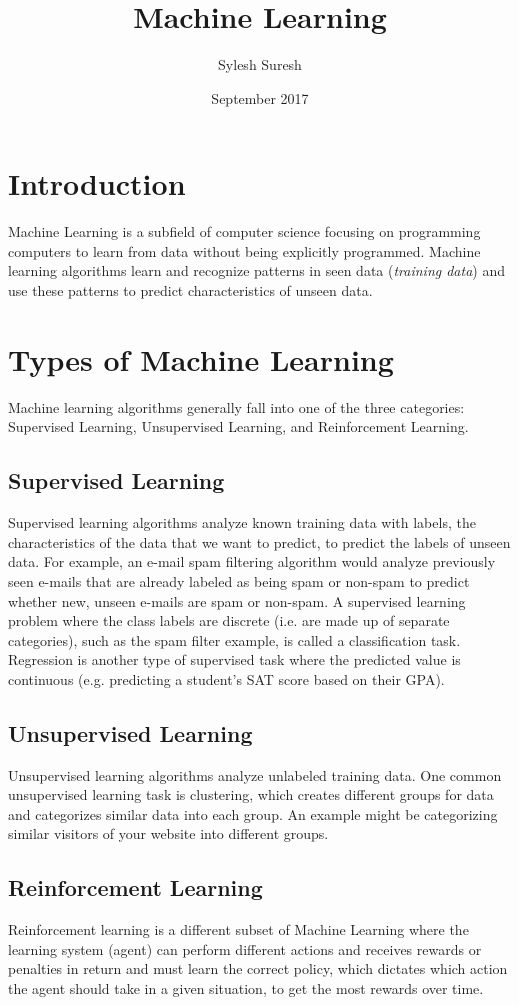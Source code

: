 \documentclass{article}
\title{Machine Learning}
\author{Sylesh Suresh }
\date{September 2017}
\begin{document}
\maketitle

\section{Introduction}
Machine Learning is a subfield of computer science focusing on programming computers to learn from data without being explicitly programmed. Machine learning algorithms learn and recognize patterns in seen data (\textit{training data}) and use these patterns to predict characteristics of unseen data. 
\section{Types of Machine Learning}
Machine learning algorithms generally fall into one of the three categories: \newline
Supervised Learning, Unsupervised Learning, and Reinforcement Learning. 
\subsection{Supervised Learning}
Supervised learning algorithms analyze known training data with labels, the characteristics of the data that we want to predict, to predict the labels of unseen data. For example, an e-mail spam filtering algorithm would analyze previously seen e-mails that are already labeled as being spam or non-spam to predict whether new, unseen e-mails are spam or non-spam. A supervised learning problem where the class labels are discrete (i.e. are made up of separate categories), such as the spam filter example, is called a classification task. Regression is another type of supervised task where the predicted value is continuous (e.g. predicting a student's SAT score based on their GPA). 
\subsection{Unsupervised Learning}
Unsupervised learning algorithms analyze unlabeled training data. One common unsupervised learning task is clustering, which creates different groups for data and categorizes similar data into each group. An example might be categorizing similar visitors of your website into different groups.
\subsection{Reinforcement Learning}
Reinforcement learning is a different subset of Machine Learning where the learning system (agent) can perform different actions and receives rewards or penalties in return and must learn the correct policy, which dictates which action the agent should take in a given situation, to get the most rewards over time.
\end{document}
